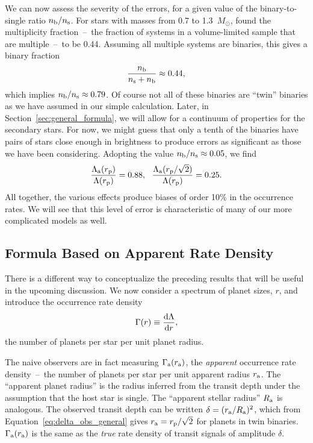 \documentclass[12pt,modern]{aastex61}
\renewcommand{\a}{_{\rm a}}
\newcommand{\s}{_{\rm s}}
\newcommand{\p}{_{\rm p}}
\renewcommand{\b}{_{\rm b}}
\begin{document}
We can now assess the severity of the errors, for a given value of the
binary-to-single ratio $n\b/n\s$. For stars with masses from 0.7 to
1.3~$M_\odot$, \citet{raghavan_survey_2010} found the multiplicity
fraction~--~the fraction of systems in a volume-limited sample that
are multiple~--~to be 0.44.  Assuming all multiple systems are
binaries, this gives a binary fraction
\begin{equation}
  \frac{n\b}{n\s + n\b} \approx 0.44,
\end{equation}
which implies $n\b/n\s \approx 0.79$.  Of course not all of
these binaries are ``twin'' binaries as we have assumed in our simple
calculation.  Later, in Section~\ref{sec:general_formula}, we will
allow for a continuum of properties for the secondary stars. For now,
we might guess that only a tenth of the binaries have pairs of stars
close enough in brightness to produce errors as significant as those
we have been considering.  Adopting the value $n\b/n\s\approx0.05$, we
find
\begin{equation}
    \frac{\Lambda\a(r\p)}{\Lambda(r\p)} = 0.88,~~
    \frac{\Lambda\a(r\p/\sqrt{2})}{\Lambda(r\p)} = 0.25.
    \label{eq:ratios}
\end{equation}
All together, the various effects produce biases of order 10\% in the
occurrence rates.  We will see that this level of error is
characteristic of many of our more complicated models as well.

\subsection{Formula Based on Apparent Rate Density}
\label{sec:model_1_density}

There is a different way to conceptualize the preceding results that
will be useful in the upcoming discussion. We now consider a spectrum
of planet sizes, $r$, and introduce the occurrence rate density
\begin{equation}
    \Gamma(r) \equiv \frac{{\rm d}\Lambda}{{\rm d}r},
    \label{eq:rate_density_defn}
\end{equation}
the number of planets per star per unit planet radius.  

The naive observers are in fact measuring $\Gamma\a(r\a)$, the {\it
apparent} occurrence rate density~--~the number of planets per star
per unit apparent radius $r\a$.  The ``apparent planet radius'' is the
radius inferred from the transit depth under the assumption that the
host star is single. The ``apparent stellar radius'' $R\a$ is
analogous.  The observed transit depth can be written $\delta =
(r\a/R\a)^2$, which from Equation~\ref{eq:delta_obs_general} gives
$r\a=r\p/\sqrt{2}$ for planets in twin binaries.  $\Gamma\a(r\a)$ is
the same as the {\it true} rate density of transit signals of
amplitude $\delta$.
\end{document}
